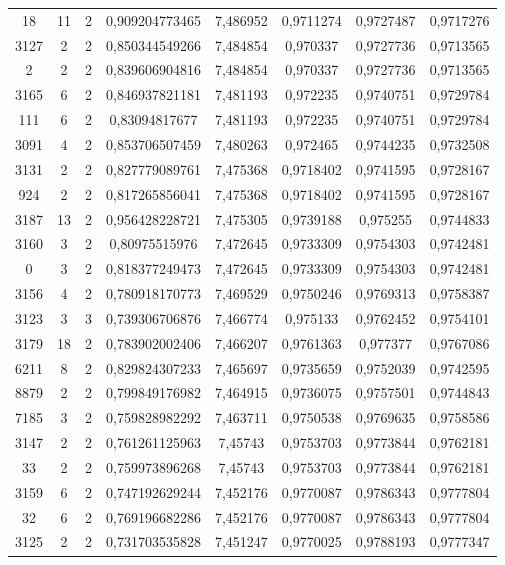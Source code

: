 \begin{longtable}{|c|c|c|c|c|c|c|c|}
18 & 11 & 2 & 0,909204773465 & 7,486952 & 0,9711274 & 0,9727487 & 0,9717276 \\
3127 & 2 & 2 & 0,850344549266 & 7,484854 & 0,970337 & 0,9727736 & 0,9713565 \\
2 & 2 & 2 & 0,839606904816 & 7,484854 & 0,970337 & 0,9727736 & 0,9713565 \\
3165 & 6 & 2 & 0,846937821181 & 7,481193 & 0,972235 & 0,9740751 & 0,9729784 \\
111 & 6 & 2 & 0,83094817677 & 7,481193 & 0,972235 & 0,9740751 & 0,9729784 \\
3091 & 4 & 2 & 0,853706507459 & 7,480263 & 0,972465 & 0,9744235 & 0,9732508 \\
3131 & 2 & 2 & 0,827779089761 & 7,475368 & 0,9718402 & 0,9741595 & 0,9728167 \\
924 & 2 & 2 & 0,817265856041 & 7,475368 & 0,9718402 & 0,9741595 & 0,9728167 \\
3187 & 13 & 2 & 0,956428228721 & 7,475305 & 0,9739188 & 0,975255 & 0,9744833 \\
3160 & 3 & 2 & 0,80975515976 & 7,472645 & 0,9733309 & 0,9754303 & 0,9742481 \\
0 & 3 & 2 & 0,818377249473 & 7,472645 & 0,9733309 & 0,9754303 & 0,9742481 \\
3156 & 4 & 2 & 0,780918170773 & 7,469529 & 0,9750246 & 0,9769313 & 0,9758387 \\
3123 & 3 & 3 & 0,739306706876 & 7,466774 & 0,975133 & 0,9762452 & 0,9754101 \\
3179 & 18 & 2 & 0,783902002406 & 7,466207 & 0,9761363 & 0,977377 & 0,9767086 \\
6211 & 8 & 2 & 0,829824307233 & 7,465697 & 0,9735659 & 0,9752039 & 0,9742595 \\
8879 & 2 & 2 & 0,799849176982 & 7,464915 & 0,9736075 & 0,9757501 & 0,9744843 \\
7185 & 3 & 2 & 0,759828982292 & 7,463711 & 0,9750538 & 0,9769635 & 0,9758586 \\
3147 & 2 & 2 & 0,761261125963 & 7,45743 & 0,9753703 & 0,9773844 & 0,9762181 \\
33 & 2 & 2 & 0,759973896268 & 7,45743 & 0,9753703 & 0,9773844 & 0,9762181 \\
3159 & 6 & 2 & 0,747192629244 & 7,452176 & 0,9770087 & 0,9786343 & 0,9777804 \\
32 & 6 & 2 & 0,769196682286 & 7,452176 & 0,9770087 & 0,9786343 & 0,9777804 \\
3125 & 2 & 2 & 0,731703535828 & 7,451247 & 0,9770025 & 0,9788193 & 0,9777347 \\

\end{longtable}
